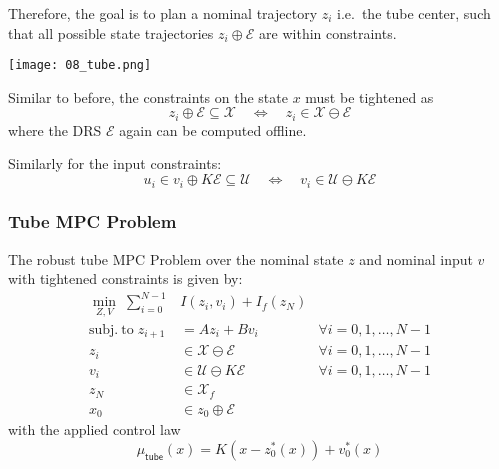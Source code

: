 \newpar{}
Therefore, the goal is to plan a nominal trajectory $z_i$ i.e.\ the tube center, such that all possible state trajectories $z_i\oplus \mathcal{E}$ are within constraints.

\begin{center}
    \texttt{[image: 08\_tube.png]}
\end{center}

\newpar{}

Similar to before, the constraints on the state $x$ must be tightened as
\begin{equation*}
    z_i \oplus \mathcal{E} \subseteq \mathcal{X} \quad \Leftrightarrow \quad z_i \in \mathcal{X}\ominus \mathcal{E}
\end{equation*}
where the DRS $\mathcal{E}$ again can be computed offline.

\newpar{}
Similarly for the input constraints:
\begin{equation*}
    u_i \in v_i \oplus K \mathcal{E} \subseteq \mathcal{U}\quad \Leftrightarrow \quad v_i \in \mathcal{U} \ominus K\mathcal{E}
\end{equation*}

\subsubsection{Tube MPC Problem}
The robust tube MPC Problem over the nominal state $z$ and nominal input $v$ with tightened constraints is given by:
\begin{align*}
    \min_{Z,V}\;         \sum_{i=0}^{N-1}                                                                & I(z_{i},v_{i})+I_{f}(z_{N})                                      \\
    \mathrm{subj.~to }\;                                                                         z_{i+1} & =Az_{i}+Bv_{i}                     & \forall i=0, 1, \ldots, N-1 \\
    z_{i}                                                                                                & \in\mathcal{X}\ominus\mathcal{E}   & \forall i=0, 1, \ldots, N-1 \\
    v_i                                                                                                  & \in\mathcal{U}\ominus K\mathcal{E} & \forall i=0, 1, \ldots, N-1 \\
    z_N                                                                                                  & \in \mathcal{X}_f                                                \\
    x_0                                                                                                  & \in z_0 \oplus \mathcal{E}
\end{align*}
with the applied control law
\begin{equation*}
    \mu_{\mathsf{tube}}(x) = K(x - z_0^*(x)) + v_0^*(x)
\end{equation*}


